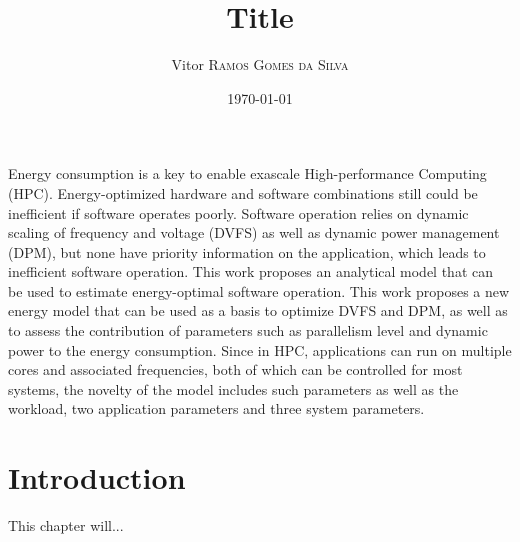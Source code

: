 \documentclass[
papersize=a4,
pagelayout=default,
fontname=latinmodern,
fontsize=11pt,
twoside,
final,
faculty=fpms,
]{umons-Thesis}
\author{Vitor \textsc{Ramos Gomes da Silva}}
\date{\today}
\title{Title}
\begin{document}
	
	\umonsThesisTitlePage
	
	
	\frontmatter
	
	\begin{umonsThesisAbstract}
		Energy consumption is a key to enable exascale High-performance Computing (HPC). Energy-optimized hardware and software combinations still could be inefficient if software operates poorly. 
		Software operation relies on dynamic scaling of frequency and voltage (DVFS) as well as dynamic power management (DPM), but none have priority information on the application, which leads to inefficient software operation. This work proposes an analytical model that can be used to estimate energy-optimal software operation. 
		This work proposes a new energy model that can be used as a basis to optimize DVFS and DPM, as well as to assess the contribution of parameters such as parallelism level and dynamic power to the energy consumption.
		Since in HPC, applications can run on multiple cores and associated frequencies, both of which can be controlled for most systems, the novelty of the model includes such parameters as well as the workload, two application parameters and three system parameters.
	\end{umonsThesisAbstract}
	
	
	\tableofcontents*
	\listoffigures*
	\listoftables*
	
	
	\mainmatter
	
	\chapter{Introduction}
	This chapter will...
	
	
\end{document}
